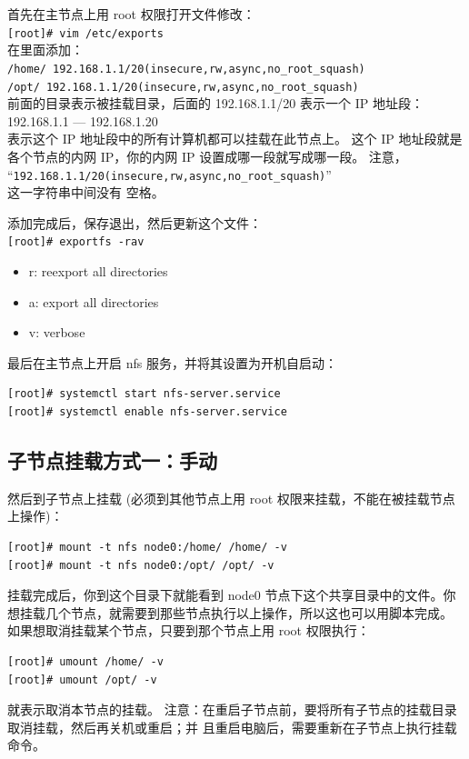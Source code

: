 {首先在主节点上用 root 权限打开文件修改：\\
\verb|[root]# vim /etc/exports|\\
在里面添加：\\
\verb|/home/ 192.168.1.1/20(insecure,rw,async,no_root_squash)|\\
\verb|/opt/ 192.168.1.1/20(insecure,rw,async,no_root_squash)|\\
前面的目录表示被挂载目录，后面的 192.168.1.1/20 表示一个 IP 地址段：\\
192.168.1.1 — 192.168.1.20\\
表示这个 IP 地址段中的所有计算机都可以挂载在此节点上。
这个 IP 地址段就是各个节点的内网 IP，你的内网 IP 设置成哪一段就写成哪一段。
注意，\\
“\verb|192.168.1.1/20(insecure,rw,async,no_root_squash)|”\\
这一字符串中间没有
空格。

添加完成后，保存退出，然后更新这个文件：\\
\verb|[root]# exportfs -rav|
\begin{itemize}
\item r: reexport all directories
\item a: export all directories
\item v: verbose
\end{itemize}
最后在主节点上开启 nfs 服务，并将其设置为开机自启动：
\begin{verbatim}
[root]# systemctl start nfs-server.service
[root]# systemctl enable nfs-server.service
\end{verbatim}

\subsection{子节点挂载方式一：手动}
然后到子节点上挂载 (必须到其他节点上用 root 权限来挂载，不能在被挂载节点上操作)：
\begin{verbatim}
[root]# mount -t nfs node0:/home/ /home/ -v
[root]# mount -t nfs node0:/opt/ /opt/ -v
\end{verbatim}
挂载完成后，你到这个目录下就能看到 node0 节点下这个共享目录中的文件。你想挂载几个节点，就需要到那些节点执行以上操作，所以这也可以用脚本完成。
如果想取消挂载某个节点，只要到那个节点上用 root 权限执行：
\begin{verbatim}
[root]# umount /home/ -v
[root]# umount /opt/ -v
\end{verbatim}
就表示取消本节点的挂载。
注意：在重启子节点前，要将所有子节点的挂载目录取消挂载，然后再关机或重启；并
且重启电脑后，需要重新在子节点上执行挂载命令。


}
